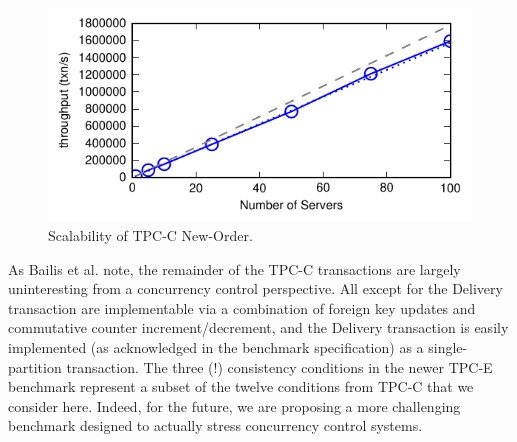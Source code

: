 \begin{figure}
\begin{center}
\includegraphics[width=\columnwidth]{figs/thru_scale.pdf}\vspace{-2em}
\end{center}
\caption{Scalability of TPC-C New-Order.}
\label{fig:clients}
\end{figure}


As Bailis et al. note, the remainder of the TPC-C transactions are
largely uninteresting from a concurrency control perspective. All
except for the Delivery transaction are implementable via a
combination of foreign key updates and commutative counter
increment/decrement, and the Delivery transaction is easily
implemented (as acknowledged in the benchmark specification) as a
single-partition transaction. The three (!)  consistency conditions in
the newer TPC-E benchmark represent a subset of the twelve conditions
from TPC-C that we consider here. Indeed, for the future, we are
proposing a more challenging benchmark designed to actually stress
concurrency control systems.
